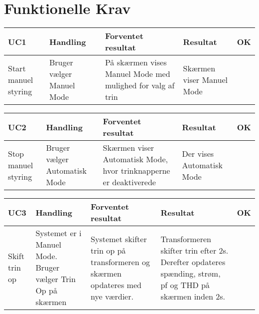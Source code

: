 
\section{Funktionelle Krav}
\begin{table}[htbp]
	\centering
	\begin{tabular}{|p{2cm}|p{3cm}|p{4cm}|p{4.5cm}|p{1cm}|}
		\hline
		\textbf{UC1} & \textbf{Handling} & \textbf{Forventet resultat} & \textbf{Resultat} &\textbf{OK} \\\hline
		Start manuel styring & Bruger vælger Manuel Mode & På skærmen vises Manuel Mode med mulighed for valg af trin & Skærmen viser Manuel Mode & \checkmark \\\hline
		
		
	\end{tabular}

	
\end{table}

\begin{table}[htbp]
	\centering
	\begin{tabular}{|p{2cm}|p{3cm}|p{4cm}|p{4.5cm}|p{1cm}|}
		\hline
		\textbf{UC2} & \textbf{Handling} & \textbf{Forventet resultat} & \textbf{Resultat} &\textbf{OK} \\\hline
		Stop manuel styring & Bruger vælger Automatisk Mode & Skærmen viser Automatisk Mode, hvor trinknapperne er deaktiverede & Der vises Automatisk Mode & \checkmark \\\hline
		
		
	\end{tabular}

	
\end{table}
\begin{table}[htbp]
	\centering
	\begin{tabular}{|p{2cm}|p{3cm}|p{4cm}|p{4.5cm}|p{1cm}|}
		\hline
		\textbf{UC3} & \textbf{Handling} & \textbf{Forventet resultat} & \textbf{Resultat} &\textbf{OK} \\\hline
		Skift trin op & Systemet er i Manuel Mode. Bruger vælger Trin Op på skærmen & Systemet skifter trin op på transformeren og skærmen opdateres med nye værdier. & Transformeren skifter trin efter 2s. Derefter opdateres spænding, strøm, pf og THD på skærmen inden 2s.  & \checkmark \\\hline
		
		
	\end{tabular}

	
\end{table}

